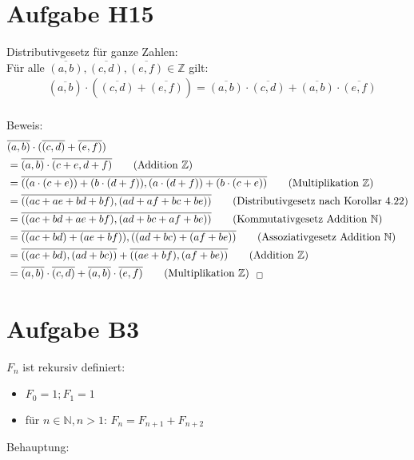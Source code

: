 \documentclass[11pt,a4paper]{article}
\begin{document}
\newpage

\section*{Aufgabe H15}
Distributivgesetz für ganze Zahlen: \\

Für alle $\overline{(a,b)}, \overline{(c,d)}, \overline{(e,f)} \in \mathbb{Z}$ gilt:\\
\begin{align*}
& (\overline{a,b}) \cdot ( \overline{(c,d)} + \overline{(e,f)} ) = \overline{(a,b)} \cdot \overline{(c,d)} +\overline{(a,b)} \cdot \overline{(e,f)}\\
\end{align*}


Beweis:
\begin{align*}
& \overline{(a,b)} \cdot ( \overline{(c,d)} + \overline{(e,f)} )\\
& = \overline{(a,b)} \cdot \overline{(c+e,d+f)}   \tag{Addition $\mathbb{Z}$}\\
& = \overline{((a \cdot (c+e)) + (b \cdot (d+f)), (a \cdot (d+f))+ (b \cdot (c+e))}   \tag{Multiplikation $\mathbb{Z}$} \\
& = \overline{((ac+ae+bd+bf),(ad+af+bc+be))}   \tag{Distributivgesetz nach Korollar 4.22}\\
& = \overline{((ac+bd+ae+bf),(ad+bc+af+be))}  \tag{Kommutativgesetz Addition $\mathbb{N}$}\\
& = \overline{((ac+bd)+(ae+bf)),((ad+bc)+(af+be))}   \tag{Assoziativgesetz Addition $\mathbb{N}$}\\
& = \overline{((ac+bd),(ad+bc))} + \overline{((ae+bf),(af+be))}   \tag{Addition $\mathbb{Z}$}\\
& = \overline{(a,b)} \cdot \overline{(c,d)} + \overline{(a,b)} \cdot \overline{(e,f)} \tag{Multiplikation $\mathbb{Z}$}  ~~_\Box\\
\end{align*}
\section*{Aufgabe B3}

$F_n$ ist rekursiv definiert:
\begin{itemize}
\item $F_0 = 1 ; F_1 = 1$
\item für $n \in \mathbb{N}, n > 1$: $F_n = F_{n+1} + F_{n+2}$
\end{itemize}
Behauptung:
\end{document}
